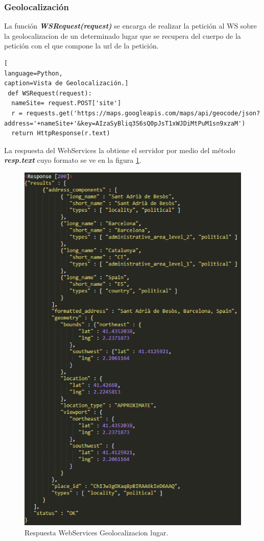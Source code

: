 \subsubsection*{Geolocalización} 
La función \textbf{\textit{WSRequest(request)}} se encarga de realizar la petición al WS sobre la geolocalizacion de un determinado lugar que se recupera del cuerpo de la petición con el que compone la url de la petición.
\begin{lstlisting}[
language=Python,
caption=Vista de Geolocalización.]
 def WSRequest(request):
  nameSite= request.POST['site']
  r = requests.get('https://maps.googleapis.com/maps/api/geocode/json?address='+nameSite+'&key=AIzaSyBliq3S6sQ0pJsT1xWJDiMtPuM1sn9xzaM')
  return HttpResponse(r.text)
\end{lstlisting}
La respuesta del WebServices la obtiene el servidor por medio del método \textbf{\textit{resp.text}} cuyo formato se ve en la figura \ref{fig:ResponseWS_Site}.
\begin{figure}[!h]
\begin{center}
   \includegraphics[width=0.4\linewidth]{Figures/swResponse_Site}
	\decoRule
	\caption[Respuesta WebServices Geolocalizacion]{Respuesta WebServices Geolocalizacion lugar.}
\label{fig:ResponseWS_Site}
\end{center}
\end{figure}
